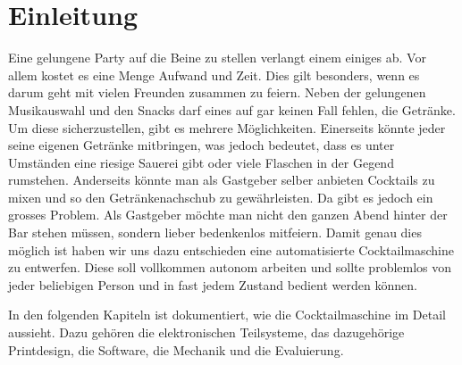 \clearpage
\section{Einleitung}
\label{sec:Einleitung}

Eine gelungene Party auf die Beine zu stellen verlangt einem einiges ab. Vor allem kostet es eine Menge Aufwand und Zeit. Dies gilt besonders, wenn es darum geht mit vielen Freunden zusammen zu feiern. Neben der gelungenen Musikauswahl und den Snacks darf eines auf gar keinen Fall fehlen, die Getränke. Um diese sicherzustellen, gibt es mehrere Möglichkeiten. Einerseits könnte jeder seine eigenen Getränke mitbringen, was jedoch bedeutet, dass es unter Umständen eine riesige Sauerei gibt oder viele Flaschen in der Gegend rumstehen. Anderseits könnte man als Gastgeber selber anbieten Cocktails zu mixen und so den Getränkenachschub zu gewährleisten. Da gibt es jedoch ein grosses Problem. Als Gastgeber möchte man nicht den ganzen Abend hinter der Bar stehen müssen, sondern lieber bedenkenlos mitfeiern. Damit genau dies möglich ist haben wir uns dazu entschieden eine automatisierte Cocktailmaschine zu entwerfen. Diese soll vollkommen autonom arbeiten und sollte problemlos von jeder beliebigen Person und in fast jedem Zustand bedient werden können. 

In den folgenden Kapiteln ist dokumentiert, wie die Cocktailmaschine im Detail aussieht. Dazu gehören die elektronischen Teilsysteme, das dazugehörige Printdesign, die Software, die Mechanik und die Evaluierung.